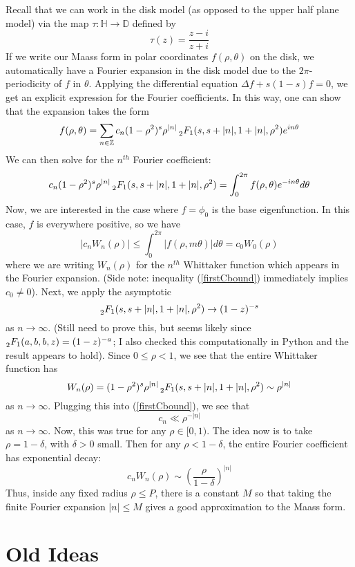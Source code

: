 \documentclass[]{article}
\begin{document}
Recall that we can work in the disk model (as opposed to the upper half plane model) via the map $\tau : \mathbb{H} \rightarrow \mathbb{D}$ defined by
$$
\tau(z) = \frac{z - i}{z + i}
$$
If we write our Maass form in polar coordinates $f(\rho, \theta)$ on the disk, we automatically have a Fourier expansion in the disk model due to the $2\pi$-periodicity of $f$ in $\theta$.
Applying the differential equation $\Delta f + s(1-s)f = 0$, we get an explicit expression for the Fourier coefficients.
In this way, one can show that the expansion takes the form
$$
f(\rho, \theta) = \sum_{n \in \mathbb{Z}}c_n(1 - \rho^2)^s\rho^{|n|}\prescript{}{2}{F_1}(s, s + |n|, 1 + |n|, \rho^2)e^{in\theta}
$$
We can then solve for the $n^{th}$ Fourier coefficient:
$$
c_n(1 - \rho^2)^s\rho^{|n|}\prescript{}{2}{F_1}(s, s + |n|, 1 + |n|, \rho^2) =
\int_{0}^{2\pi}f(\rho, \theta)e^{-in\theta}d\theta
$$
Now, we are interested in the case where $f = \phi_0$ is the base eigenfunction.
In this case, $f$ is everywhere positive, so we have
\begin{equation}\label{firstCbound}
|c_nW_n(\rho)| \leq \int_{0}^{2\pi}|f(\rho,m \theta)|d\theta = c_0W_0(\rho)
\end{equation}
where we are writing $W_n(\rho)$ for the $n^{th}$ Whittaker function which appears in the Fourier expansion.
(Side note: inequality (\ref{firstCbound}) immediately implies $c_0 \neq 0$).
Next, we apply the asymptotic
$$
\prescript{}{2}{F_1}(s, s + |n|, 1 + |n|, \rho^2) \rightarrow (1 - z)^{-s}
$$
as $n \rightarrow \infty$. (Still need to prove this, but seems likely since $\prescript{}{2}{F_1}(a, b, b, z) = (1 - z)^{-a}$; I also checked this computationally in Python and the result appears to hold).
Since $0 \leq \rho < 1$, we see that the entire Whittaker function has
$$
W_n(\rho) = (1 - \rho^2)^s\rho^{|n|}\prescript{}{2}{F_1}(s, s + |n|, 1 + |n|, \rho^2) \sim \rho^{|n|}
$$
as $n \rightarrow \infty$.
Plugging this into (\ref{firstCbound}), we see that
$$
c_n \ll \rho^{-|n|}
$$
as $n \rightarrow \infty$.
Now, this was true for any $\rho \in [0, 1)$.
The idea now is to take $\rho = 1 - \delta$, with $\delta > 0$ small.
Then for any $\rho < 1 - \delta$, the entire Fourier coefficient has exponential decay:
$$
c_nW_n(\rho) \sim \left( \frac{\rho}{1 - \delta} \right)^{|n|}
$$
Thus, inside any fixed radius $\rho \leq P$, there is a constant $M$ so that taking the finite Fourier expansion $|n| \leq M$ gives a good approximation to the Maass form.

\section*{Old Ideas}
\end{document}
